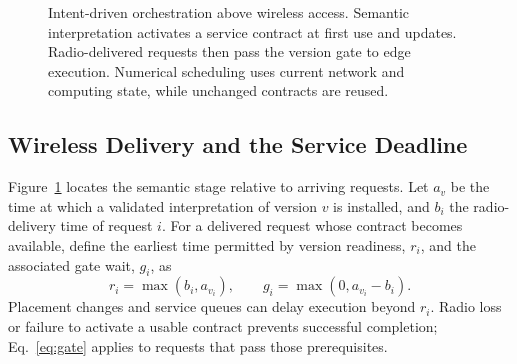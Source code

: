 \begin{figure}[t]
\centering
{}
\caption{Intent-driven orchestration above wireless access. Semantic interpretation activates a service contract at first use and updates. Radio-delivered requests then pass the version gate to edge execution. Numerical scheduling uses current network and computing state, while unchanged contracts are reused.}
\label{fig:system}
\end{figure}

\subsection{Wireless Delivery and the Service Deadline}
Figure~\ref{fig:system} locates the semantic stage relative to arriving requests. Let $a_v$ be the time at which a validated interpretation of version $v$ is installed, and $b_i$ the radio-delivery time of request $i$. For a delivered request whose contract becomes available, define the earliest time permitted by version readiness, $r_i$, and the associated gate wait, $g_i$, as
\begin{equation}
r_i=\max(b_i,a_{v_i}),\qquad
g_i=\max(0,a_{v_i}-b_i).
\label{eq:gate}
\end{equation}
Placement changes and service queues can delay execution beyond $r_i$. Radio loss or failure to activate a usable contract prevents successful completion; Eq.~\eqref{eq:gate} applies to requests that pass those prerequisites.


